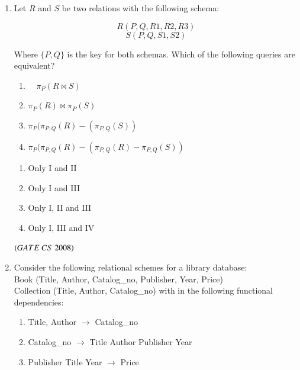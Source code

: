 \documentclass[journal, onecolumn]{IEEEtran}
\numberwithin{equation}{enumi}
\numberwithin{figure}{enumi}
\begin{document}
\begin{enumerate}
The number of bits required for addressing the next level page table (or page frame) in the page table entry of the first, second, and third level page tables are respectively:
\vspace{-1em}%
\begin{multicols}{4}
\begin{enumerate}
   \item $20$, $20$ and $20$
   \item $24$, $24$ and $24$
   \item $24$, $24$ and $20$
   \item $25$, $25$ and $24$
\end{enumerate}
\end{multicols}
\hfill $\brak{GATE\ CS\  2008}$

\item  Let $R$ and $S$ be two relations with the following schema:

\[
R(P, Q, R1, R2, R3)
\]
\[
S(P, Q, S1, S2)
\]

Where $\{P, Q\}$ is the key for both schemas. Which of the following queries are equivalent?

\begin{enumerate}[label=\Roman*.]
   \item $\quad \pi_{P}(R \Join S)$
   \item $\pi_{P}(R) \Join \pi_{P}(S)$
   \item $\pi_{P}(\pi_{P,Q}(R) - (\pi_{P,Q}(S))$
   \item $\pi_{P}(\pi_{P,Q}(R)-(\pi_{P,Q}(R) - \pi_{P,Q}(S))$
\end{enumerate}
\begin{multicols}{4}
\begin{enumerate}
   \item Only I and II
   \item Only I and III
   \item Only I, II and III
   \item Only I, III and IV
\end{enumerate}
\end{multicols}
\hfill $\brak{GATE\ CS\  2008}$

\item Consider the following relational schemes for a library database: \\
{Book (Title, Author, Catalog\_no, Publisher, Year, Price)}\\
{Collection (Title, Author, Catalog\_no)}
with in the following functional dependencies:  
\begin{enumerate}[label=\Roman*.]
   \item Title, Author $\rightarrow$ Catalog\_no  
   \item Catalog\_no $\rightarrow$ Title Author Publisher Year  
   \item Publisher Title Year $\rightarrow$ Price  
\end{enumerate}


\end{enumerate}
\end{document}
